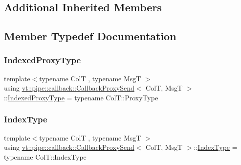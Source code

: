 \subsection*{Additional Inherited Members}


\subsection{Member Typedef Documentation}
\mbox{\label{structvt_1_1pipe_1_1callback_1_1_callback_proxy_send_a993aff1afaaf07a0d2c60a4ca96426f8}} 
\subsubsection{\texorpdfstring{Indexed\+Proxy\+Type}{IndexedProxyType}}
{\footnotesize\ttfamily template$<$typename ColT , typename MsgT $>$ \\
using \hyperlink{structvt_1_1pipe_1_1callback_1_1_callback_proxy_send}{vt\+::pipe\+::callback\+::\+Callback\+Proxy\+Send}$<$ ColT, MsgT $>$\+::\hyperlink{structvt_1_1pipe_1_1callback_1_1_callback_proxy_send_a993aff1afaaf07a0d2c60a4ca96426f8}{Indexed\+Proxy\+Type} =  typename Col\+T\+::\+Proxy\+Type}

\mbox{\label{structvt_1_1pipe_1_1callback_1_1_callback_proxy_send_adf233dca6b029304153ba59fecf6113f}} 
\subsubsection{\texorpdfstring{Index\+Type}{IndexType}}
{\footnotesize\ttfamily template$<$typename ColT , typename MsgT $>$ \\
using \hyperlink{structvt_1_1pipe_1_1callback_1_1_callback_proxy_send}{vt\+::pipe\+::callback\+::\+Callback\+Proxy\+Send}$<$ ColT, MsgT $>$\+::\hyperlink{structvt_1_1pipe_1_1callback_1_1_callback_proxy_send_adf233dca6b029304153ba59fecf6113f}{Index\+Type} =  typename Col\+T\+::\+Index\+Type}

